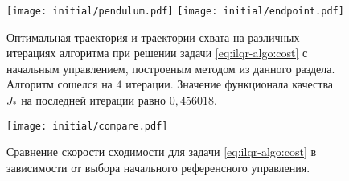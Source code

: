 \documentclass[../../doc.tex]{subfiles}
\begin{document}
    \begin{figure}[h]
        \begin{center}
            \texttt{[image: initial/pendulum.pdf]}
            \texttt{[image: initial/endpoint.pdf]}
        \end{center}
        \caption{
            Оптимальная траектория и траектории схвата на различных итерациях алгоритма при решении задачи \eqref{eq:ilqr-algo:cost} с начальным управлением, построеным методом из данного раздела.
            Алгоритм сошелся на $4$ итерации.
            Значение функционала качества $J_*$ на последней итерации равно $0,\!456018$.
        }
        \label{fig:initial:pendulum}
    \end{figure}
    \begin{figure}[h]
        \begin{center}
            \texttt{[image: initial/compare.pdf]}
        \end{center}
        \caption{Сравнение скорости сходимости для задачи \eqref{eq:ilqr-algo:cost} в зависимости от выбора начального референсного управления.}
        \label{fig:compare-init}
    \end{figure}

    \ifSubfilesClassLoaded{
        \nocite{*}
        \clearpage
        
        
    }{}
\end{document}
